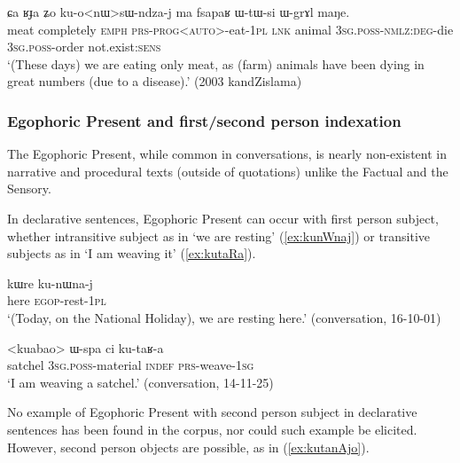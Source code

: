 \begin{exe}
\ex \label{ex:konWsWndzaj2}
\gll ɕa ʁɟa ʑo ku-o<nɯ>sɯ-ndza-j ma fsapaʁ ɯ-tɯ-si ɯ-grɤl maŋe. \\
meat completely \textsc{emph} \textsc{prs}-\textsc{prog}<\textsc{auto}>-eat-\textsc{1pl} \textsc{lnk} animal \textsc{3sg}.\textsc{poss}-\textsc{nmlz}:\textsc{deg}-die \textsc{3sg}.\textsc{poss}-order not.exist:\textsc{sens} \\
\glt `(These days) we are eating only meat, as (farm) animals have been dying in great numbers (due to a disease).' (2003 kandZislama)
\end{exe}

\subsubsection{Egophoric Present and first/second person indexation} \label{sec:egophoric.evd} \label{sec:egophoric.interrogative}
     
The Egophoric Present, while common in conversations, is nearly non-existent in narrative and procedural texts (outside of quotations) unlike the Factual and the Sensory. 

In declarative sentences, Egophoric Present can occur with first person subject, whether intransitive subject as in  `we are resting' (\ref{ex:kunWnaj}) or transitive subjects as in  `I am weaving it' (\ref{ex:kutaRa}).

\begin{exe}
	\ex \label{ex:kunWnaj}
	\gll kɯre ku-nɯna-j \\
	here \textsc{egop}-rest-\textsc{1pl} \\
	\glt `(Today, on the National Holiday), we are resting here.' (conversation, 16-10-01)
\end{exe}
	
\begin{exe}
\ex \label{ex:kutaRa}
\gll <kuabao> ɯ-spa ci ku-taʁ-a \\
satchel \textsc{3sg}.\textsc{poss}-material \textsc{indef} \textsc{prs}-weave-\textsc{1sg} \\
\glt `I am weaving a satchel.' (conversation, 14-11-25)
\end{exe}

No example of Egophoric Present with second person subject in declarative sentences has been found in the corpus, nor could such example be elicited. However, second person objects are possible, as in (\ref{ex:kutanAjo}).

